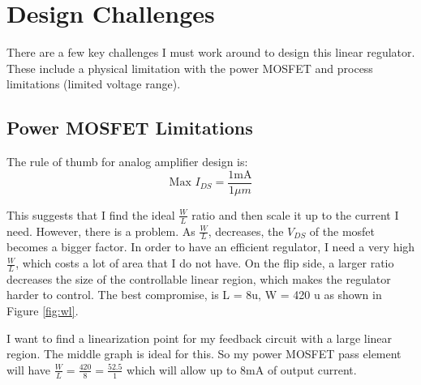 \documentclass[10pt]{amsart}
\begin{document}
\section{Design Challenges}

There are a few key challenges I must work around to design this linear regulator. These include a physical limitation with the power MOSFET and process limitations (limited voltage range).

\subsection{Power MOSFET Limitations}

The rule of thumb for analog amplifier design is:
\begin{equation}
\text{Max } I_{DS} = \frac{1 \text{mA}}{ 1 \mu m}
\end{equation}

This suggests that I find the ideal $\frac{W}{L}$ ratio and then scale it up to the current I need. However, there is a problem. As $\frac{W}{L}$, decreases, the $V_{DS}$ of the mosfet becomes a bigger factor. In order to have an efficient regulator, I need a very high $\frac{W}{L}$, which costs a lot of area that I do not have. On the flip side, a larger ratio decreases the size of the controllable linear region, which makes the regulator harder to control. The best compromise, is L = 8u, W = 420 u as shown in Figure \ref{fig:wl}.

I want to find a linearization point for my feedback circuit with a large linear region. The middle graph is ideal for this. So my power MOSFET pass element will have $\frac{W}{L}=\frac{420}{8}=\frac{52.5}{1}$ which will allow up to 8mA of output current.
\end{document}
